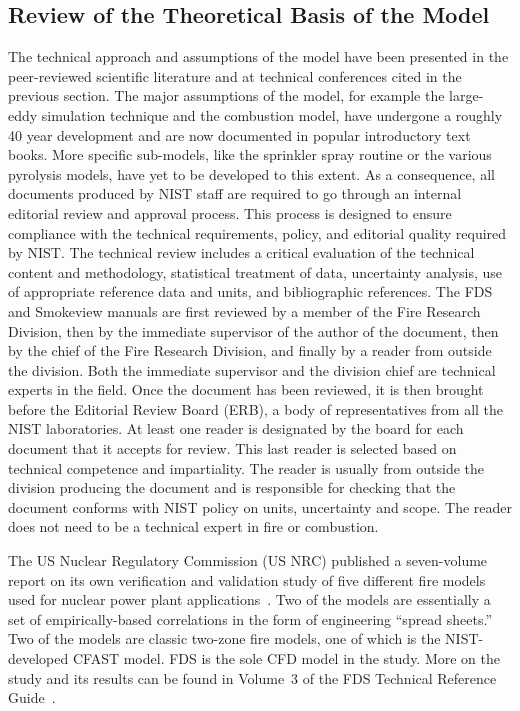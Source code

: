 \documentclass[11pt]{book}
\begin{document}
\subsection{Review of the Theoretical Basis of the Model}
\label{JustAA}

The technical approach and assumptions of the model have been presented in the peer-reviewed scientific literature and at technical conferences cited in the previous section. The major assumptions of the model, for example the large-eddy simulation technique and the combustion model, have undergone a roughly 40 year development and are now documented in popular introductory text books. More specific sub-models, like the sprinkler spray routine or the various pyrolysis models, have yet to be developed to this extent. As a consequence, all documents produced by NIST staff are required to go through an internal editorial review and approval process. This process is designed to ensure compliance with the technical requirements, policy, and editorial quality required by NIST. The technical review includes a critical evaluation of the technical content and methodology, statistical treatment of data, uncertainty analysis, use of appropriate reference data and units, and bibliographic references. The FDS and Smokeview manuals are first reviewed by a member of the Fire Research Division, then by the immediate supervisor of the author of the document, then by the chief of the Fire Research Division, and finally by a reader from outside the division. Both the immediate supervisor and the division
chief are technical experts in the field. Once the document has been reviewed, it is then brought before the Editorial Review Board (ERB), a body of representatives from all the NIST laboratories. At least one reader is designated by the board for each document that it accepts for review. This last reader is selected based on technical competence and impartiality. The reader is usually from outside the division producing the document and is responsible for checking that the document conforms with NIST policy on units, uncertainty and scope. The reader does not need to be a technical expert in fire or combustion.

The US Nuclear Regulatory Commission (US NRC) published a seven-volume report on its own verification and validation study of five different fire models used for nuclear power plant applications~\cite{NUREG_1824_Sup_1}. Two of the models are essentially a set of empirically-based correlations in the form of engineering ``spread sheets.'' Two of the models are classic two-zone fire models, one of which is the NIST-developed CFAST model. FDS is the sole CFD model in the study. More on the study and its results can be found in Volume~3 of the FDS Technical Reference Guide~\cite{FDS_Tech_Guide}.
\end{document}
